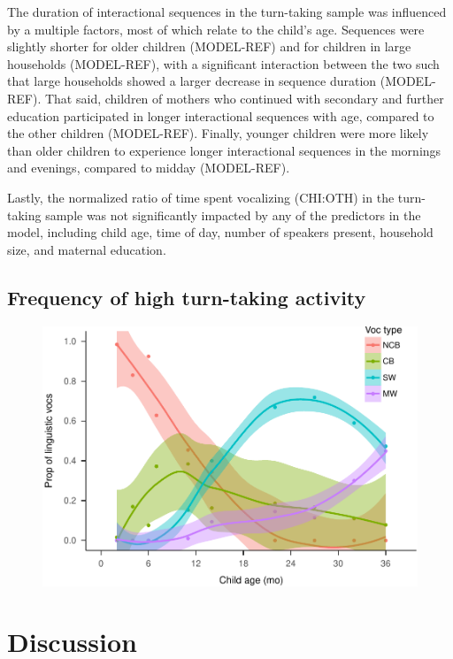 \documentclass[floatsintext,man]{apa6}
\theoremstyle{definition}
\theoremstyle{definition}
\theoremstyle{definition}
\theoremstyle{remark}
\begin{document}
The duration of interactional sequences in the turn-taking sample was
influenced by a multiple factors, most of which relate to the child's
age. Sequences were slightly shorter for older children (MODEL-REF) and
for children in large households (MODEL-REF), with a significant
interaction between the two such that large households showed a larger
decrease in sequence duration (MODEL-REF). That said, children of
mothers who continued with secondary and further education participated
in longer interactional sequences with age, compared to the other
children (MODEL-REF). Finally, younger children were more likely than
older children to experience longer interactional sequences in the
mornings and evenings, compared to midday (MODEL-REF).

Lastly, the normalized ratio of time spent vocalizing (CHI:OTH) in the
turn-taking sample was not significantly impacted by any of the
predictors in the model, including child age, time of day, number of
speakers present, household size, and maternal education.

\subsection{Frequency of high turn-taking
activity}\label{frequency-of-high-turn-taking-activity}

\begin{figure}
\centering
\includegraphics{Tseltal-CLE_files/figure-latex/plot_chi_voctypes_overall-1.pdf}
\caption{}
\end{figure}

\section{Discussion}\label{disc}
\end{document}
